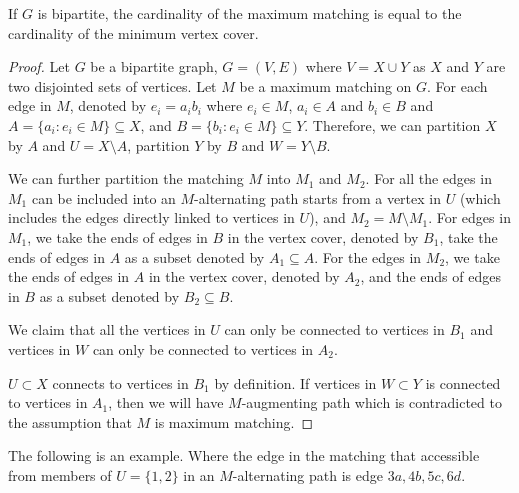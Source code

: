                 \begin{theorem}
                    If $G$ is bipartite, the cardinality of the maximum matching is equal to the cardinality of the minimum vertex cover.
                \end{theorem}

                \begin{proof}
                    Let $G$ be a bipartite graph, $G = (V, E)$ where $V = X\cup Y$ as $X$ and $Y$ are two disjointed sets of vertices. Let $M$ be a maximum matching on $G$. For each edge in $M$, denoted by $e_i = a_ib_i$ where $e_i \in M$, $a_i \in A$ and $b_i \in B$ and $A = \{a_i: e_i \in M\} \subseteq X$, and $B = \{b_i: e_i \in M\} \subseteq Y$. Therefore, we can partition $X$ by $A$ and $U = X\setminus A$, partition $Y$ by $B$ and $W = Y\setminus B$.

                    We can further partition the matching $M$ into $M_1$ and $M_2$. For all the edges in $M_1$ can be included into an $M$-alternating path starts from a vertex in $U$ (which includes the edges directly linked to vertices in $U$), and $M_2 = M \setminus M_1$. For edges in $M_1$, we take the ends of edges in $B$ in the vertex cover, denoted by $B_1$, take the ends of edges in $A$ as a subset denoted by $A_1 \subseteq A$. For the edges in $M_2$, we take the ends of edges in $A$ in the vertex cover, denoted by $A_2$, and the ends of edges in $B$ as a subset denoted by $B_2 \subseteq B$. 

                    We claim that all the vertices in $U$ can only be connected to vertices in $B_1$ and vertices in $W$ can only be connected to vertices in $A_2$.

                    $U \subset X$ connects to vertices in $B_1$ by definition. If vertices in $W \subset Y$ is connected to vertices in $A_1$, then we will have $M$-augmenting path which is contradicted to the assumption that $M$ is maximum matching.
                \end{proof}

                The following is an example. Where the edge in the matching that accessible from members of $U = \{1, 2\}$ in an $M$-alternating path is edge $3a, 4b, 5c, 6d$.

